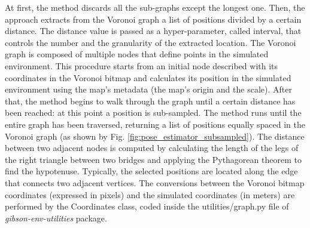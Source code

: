 At first, the method discards all the sub-graphs except the longest one. Then, the approach extracts from the Voronoi graph a list of positions divided by a certain distance. The distance value is passed as a hyper-parameter, called \textsf{interval}, that controls the number and the granularity of the extracted location. The Voronoi graph is composed of multiple nodes that define points in the simulated environment. This procedure starts from an initial node described with its coordinates in the Voronoi bitmap and calculates its position in the simulated environment using the map's metadata (the map's origin and the scale). After that, the method begins to walk through the graph until a certain distance has been reached: at this point a position is sub-sampled. The method runs until the entire graph has been traversed, returning a list of positions equally spaced in the Voronoi graph (as shown by Fig. \ref{fig:pose_estimator_subsampled}). The distance between two adjacent nodes is computed by calculating the length of the legs of the right triangle between two bridges and applying the Pythagorean theorem to find the hypotenuse. Typically, the selected positions are located along the edge that connects two adjacent vertices. The conversions between the Voronoi bitmap coordinates (expressed in pixels) and the simulated coordinates (in meters) are performed by the \textsf{Coordinates} class, coded inside the \textsf{utilities/graph.py} file of \textit{gibson-env-utilities} package.

